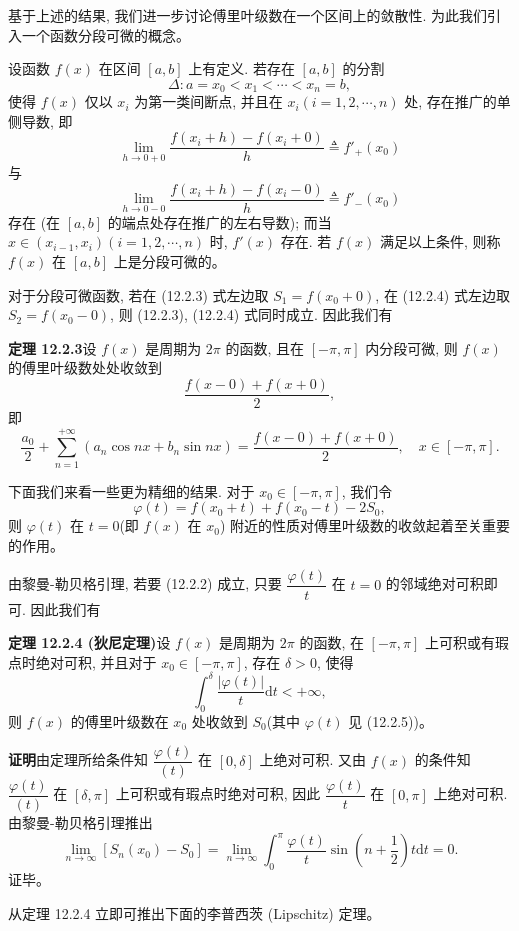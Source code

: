 \documentclass[UTF8,12pt,a4paper,fontset=fandol]{ctexart}
\begin{document}
基于上述的结果, 我们进一步讨论傅里叶级数在一个区间上的敛散性. 为此我们引入一个函数分段可微的概念。

设函数 $f(x)$ 在区间 $[a,b]$ 上有定义. 若存在 $[a,b]$ 的分割
\[
  \Delta: a=x_0<x_1<\cdots<x_n=b,
\]
使得 $f(x)$ 仅以 $x_i$ 为第一类间断点, 并且在 $x_i(i=1,2,\cdots,n)$ 处, 存在推广的单侧导数, 即
\[
  \lim_{h\to0+0}\frac{f(x_i+h)-f(x_i+0)}{h}\triangleq f'_+(x_0)
\]
与
\[
  \lim_{h\to0-0}\frac{f(x_i+h)-f(x_i-0)}{h}\triangleq f'_-(x_0)
\]
存在 (在 $[a,b]$ 的端点处存在推广的左右导数); 而当 $x\in(x_{i-1},x_i)(i=1,2,\cdots,n)$ 时, $f'(x)$ 存在. 若 $f(x)$ 满足以上条件, 则称 $f(x)$ 在 $[a,b]$ 上是分段可微的。

对于分段可微函数, 若在 (12.2.3) 式左边取 $S_1=f(x_0+0)$, 在 (12.2.4) 式左边取 $S_2=f(x_0-0)$, 则 (12.2.3), (12.2.4) 式同时成立. 因此我们有

\noindent\textbf{定理 12.2.3}\quad 设 $f(x)$ 是周期为 $2\pi$ 的函数, 且在 $[-\pi,\pi]$ 内分段可微, 则 $f(x)$ 的傅里叶级数处处收敛到
\[
  \frac{f(x-0)+f(x+0)}{2},
\]
即
\[
  \frac{a_0}{2}+\sum_{n=1}^{+\infty}(a_n\cos nx+b_n\sin nx)
  =
  \frac{f(x-0)+f(x+0)}{2},
  \quad x\in[-\pi,\pi].
\]

下面我们来看一些更为精细的结果. 对于 $x_0\in[-\pi,\pi]$, 我们令
\begin{equation}
  \varphi(t)=f(x_0+t)+f(x_0-t)-2S_0,
  \tag{12.2.5}
\end{equation}
则 $\varphi(t)$ 在 $t=0$(即 $f(x)$ 在 $x_0$) 附近的性质对傅里叶级数的收敛起着至关重要的作用。

由黎曼-勒贝格引理, 若要 (12.2.2) 成立, 只要 $\dfrac{\varphi(t)}{t}$ 在 $t=0$ 的邻域绝对可积即可. 因此我们有

\noindent\textbf{定理 12.2.4 (狄尼定理)}\quad 设 $f(x)$ 是周期为 $2\pi$ 的函数, 在 $[-\pi,\pi]$ 上可积或有瑕点时绝对可积, 并且对于 $x_0\in[-\pi,\pi]$, 存在 $\delta>0$, 使得
\[
  \int_0^\delta\frac{|\varphi(t)|}{t}\mathrm dt<+\infty,
\]
则 $f(x)$ 的傅里叶级数在 $x_0$ 处收敛到 $S_0$(其中 $\varphi(t)$ 见 (12.2.5))。

\noindent\textbf{证明}\quad 由定理所给条件知 $\dfrac{\varphi(t)}{(t)}$ 在 $[0,\delta]$ 上绝对可积. 又由 $f(x)$ 的条件知 $\dfrac{\varphi(t)}{(t)}$ 在 $[\delta,\pi]$ 上可积或有瑕点时绝对可积, 因此 $\dfrac{\varphi(t)}{t}$ 在 $[0,\pi]$ 上绝对可积. 由黎曼-勒贝格引理推出
\[
  \lim_{n\to\infty}[S_n(x_0)-S_0]
  =\lim_{n\to\infty}\int_0^\pi
  \frac{\varphi(t)}{t}\sin\left(n+\frac12\right)t\mathrm dt=0.
\]
证毕。

从定理 12.2.4 立即可推出下面的李普西茨 (Lipschitz) 定理。
\end{document}
